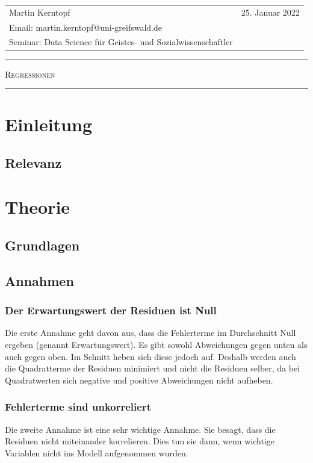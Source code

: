 \documentclass[10pt,a4paper]{article}
\begin{document}
\thispagestyle{empty}
\frenchspacing
\begin{flushleft}
\begin{tabular}{p{11.5cm} r}
Martin Kerntopf & 25. Januar 2022 \\
Email: martin.kerntopf@uni-greifswald.de \\
Seminar: Data Science für Geistes- und Sozialwissenschaftler 
\end{tabular}
\end{flushleft}
\hrule
\begin{center}
\vspace{0.4cm}
\large{\textsc{Regressionen}}

\vspace{0.4cm}
\end{center}
\hrule 
\frenchspacing

\tableofcontents

\section{Einleitung}
    \subsection{Relevanz}
\section{Theorie}
    \subsection{Grundlagen}
    \subsection{Annahmen}
        \subsubsection{Der Erwartungswert der Residuen ist Null}
        Die erste Annahme geht davon aus, dass die Fehlerterme im Durchschnitt Null ergeben (genannt Erwartungswert). Es gibt sowohl Abweichungen gegen unten als auch gegen oben. Im Schnitt heben sich diese jedoch auf. Deshalb werden auch die Quadratterme der Residuen minimiert und nicht die Residuen selber, da bei Quadratwerten sich negative und positive Abweichungen nicht aufheben.
        \subsubsection{Fehlerterme sind unkorreliert}
        Die zweite Annahme ist eine sehr wichtige Annahme. Sie besagt, dass die Residuen nicht miteinander korrelieren. Dies tun sie dann, wenn wichtige Variablen nicht ins Modell aufgenommen wurden.
\end{document}

